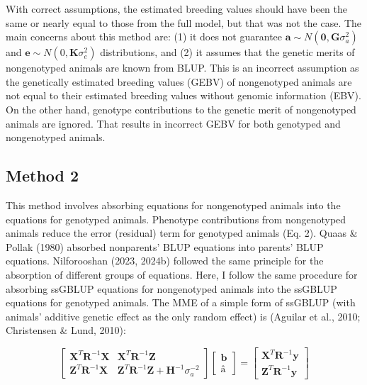 \documentclass[authordate, empirical]{jote-new-article}
\begin{document}
	With correct assumptions, the estimated breeding values should have been the same or nearly equal to those from the full model, but that was not the case. The main concerns about this method are: (1) it does not guarantee $\textbf{a}\sim N(\textbf{0},\textbf{G}\sigma_a^2 )$ and $\textbf{e}\sim N(0,\textbf{K}\sigma_e^2 )$ distributions, and (2) it assumes that the genetic merits of nongenotyped animals are known from BLUP. This is an incorrect assumption as the genetically estimated breeding values (GEBV) of nongenotyped animals are not equal to their estimated breeding values without genomic information (EBV). On the other hand, genotype contributions to the genetic merit of nongenotyped animals are ignored. That results in incorrect GEBV for both genotyped and nongenotyped animals.



	\subsection{Method 2}



	This method involves absorbing equations for nongenotyped animals into the equations for genotyped animals. Phenotype contributions from nongenotyped animals reduce the error (residual) term for genotyped animals (Eq. 2). Quaas \& Pollak (1980) absorbed nonparents' BLUP equations into parents' BLUP equations. Nilforooshan (2023, 2024b) followed the same principle for the absorption of different groups of equations. Here, I follow the same procedure for absorbing ssGBLUP equations for nongenotyped animals into the ssGBLUP equations for genotyped animals. The MME of a simple form of ssGBLUP (with animals' additive genetic effect as the only random effect) is (Aguilar et al., 2010; Christensen \& Lund, 2010):



	\begin{equation*}
		\begin{bmatrix}
		\textbf{X}^T \textbf{R}^{-1} \textbf{X}&\textbf{X}^T \textbf{R}^{-1} \textbf{Z}\\\textbf{Z}^T \textbf{R}^{-1} \textbf{X}&\textbf{Z}^T \textbf{R}^{-1} \textbf{Z}+\textbf{H}^{-1} \sigma_a^{-2}
		\end{bmatrix}
		\begin{bmatrix}
			\textbf{\^{b}}\\\textbf{\^{a}}
		\end{bmatrix}=
		\begin{bmatrix}\textbf{X}^T \textbf{R}^{-1} \textbf{y}\\\textbf{Z}^T \textbf{R}^{-1} \textbf{y}
		\end{bmatrix}
	\end{equation*}
\end{document}
